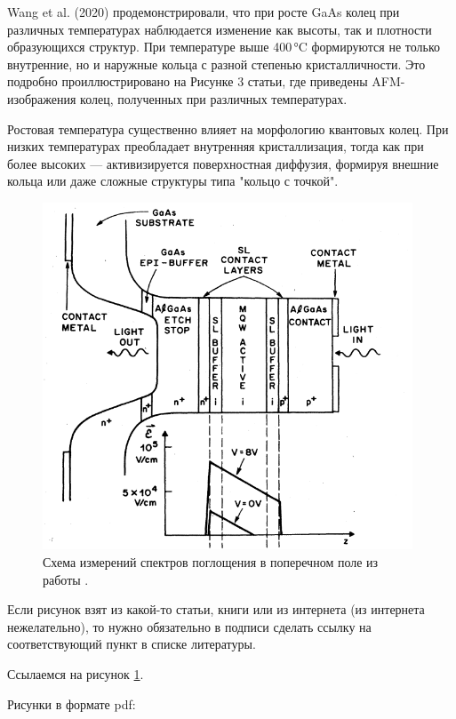 \documentclass[14pt,oneside]{extarticle}
\begin{document}
Wang et al. (2020) продемонстрировали, что при росте GaAs колец при различных температурах наблюдается изменение как высоты, так и плотности образующихся структур. При температуре выше 400 °C формируются не только внутренние, но и наружные кольца с разной степенью кристалличности. Это подробно проиллюстрировано на Рисунке 3 статьи, где приведены AFM-изображения колец, полученных при различных температурах.

Ростовая температура существенно влияет на морфологию квантовых колец. При низких температурах преобладает внутренняя кристаллизация, тогда как при более высоких — активизируется поверхностная диффузия, формируя внешние кольца или даже сложные структуры типа "кольцо с точкой". 

\begin{figure}
\begin{center}
    \includegraphics[width=11cm]{images/Miller2-Figure2.png}
    \caption{\label{fig:miller2-2}
        Схема измерений спектров поглощения в поперечном поле из работы \cite{miller1}.}
\end{center}
\end{figure}
    
Если рисунок взят из какой-то статьи, книги или из интернета (из интернета нежелательно), то нужно обязательно в подписи сделать ссылку на соответствующий пункт в списке литературы.

Ссылаемся на рисунок \ref{fig:miller2-2}.

Рисунки в формате pdf:
\end{document}
